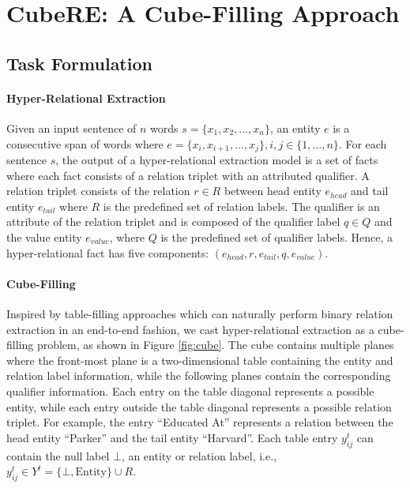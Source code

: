 \documentclass[11pt]{article}
\newcommand{\modelname}{CubeRE}
\begin{document}
\section{{\modelname{}: A Cube-Filling Approach}}

\subsection{Task Formulation}
\paragraph{Hyper-Relational Extraction}
Given an input sentence of $n$ words $s=\{x_1, x_2, ..., x_n\}$, an entity $e$ is a consecutive span of words where $e = \{x_i, x_{i+1}, ..., x_j\}, i,j \in \{1, ..., n\}$.
For each sentence $s$, the output of a hyper-relational extraction model is a set of facts where each fact consists of a relation triplet with an attributed qualifier.
A relation triplet consists of the relation $r \in R$ between head entity $e_{head}$ and tail entity $e_{tail}$ where $R$ is the predefined set of relation labels. 
The qualifier is an attribute of the relation triplet and is composed of the qualifier label $q \in Q$ and the value entity $e_{value}$, where $Q$ is the predefined set of qualifier labels.
Hence, a hyper-relational fact has five components: $(e_{head}, r, e_{tail}, q, e_{value})$.

\paragraph{Cube-Filling}
Inspired by table-filling approaches which can naturally perform binary relation extraction in an end-to-end fashion, we cast hyper-relational extraction as a cube-filling problem, as shown in Figure \ref{fig:cube}.
The cube contains multiple planes where the front-most plane is a two-dimensional table 
containing the entity and relation label information, while the following planes contain the corresponding qualifier information.
Each entry on the table diagonal represents a possible entity, while each entry outside the table diagonal represents a possible relation triplet.
For example, the entry ``Educated At'' represents a relation between the head entity ``Parker'' and the tail entity ``Harvard''.
Each table entry $y_{ij}^t$ can contain the null label $\bot$, an entity or relation label, i.e., $y_{ij}^t \in Y^t = \{\bot, \text{Entity}\} \cup{R}$.
\end{document}
